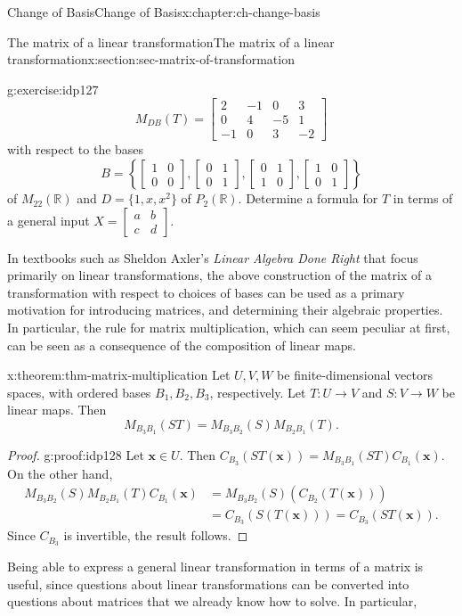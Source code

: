 \documentclass[oneside,10pt,]{book}
\numberwithin{equation}{section}
\newcommand{\bbm}{\begin{bmatrix}}
\newcommand{\ebm}{\end{bmatrix}}
\newcommand{\R}{\mathbb{R}}
\newcommand{\xx}{\mathbf{x}}
\newcommand{\amp}{&}
\begin{document}
\begin{chapterptx}{Change of Basis}{}{Change of Basis}{}{}{x:chapter:ch-change-basis}
\begin{sectionptx}{The matrix of a linear transformation}{}{The matrix of a linear transformation}{}{}{x:section:sec-matrix-of-transformation}
\begin{inlineexercise}{}{g:exercise:idp127}
\begin{equation*}
M_{DB}(T) = \bbm 2\amp -1\amp 0\amp 3\\0\amp 4\amp -5\amp 1\\-1\amp 0\amp 3\amp -2\ebm
\end{equation*}
with respect to the bases%
\begin{equation*}
B = \left\{\bbm 1\amp 0\\0\amp 0\ebm, \bbm 0\amp 1\\0\amp 1\ebm, \bbm 0\amp 1\\1\amp 0\ebm, \bbm 1\amp 0\\0\amp 1\ebm\right\}
\end{equation*}
of \(M_{22}(\R)\) and \(D=\{1,x,x^2\}\) of \(P_2(\R)\). Determine a formula for \(T\) in terms of a general input \(X=\bbm a\amp b\\c\amp d\ebm\).%
\end{inlineexercise}%
In textbooks such as Sheldon Axler's \emph{Linear Algebra Done Right} that focus primarily on linear transformations, the above construction of the matrix of a transformation with respect to choices of bases can be used as a primary motivation for introducing matrices, and determining their algebraic properties. In particular, the rule for matrix multiplication, which can seem peculiar at first, can be seen as a consequence of the composition of linear maps.%
\begin{theorem}{}{}{x:theorem:thm-matrix-multiplication}%
Let \(U,V,W\) be finite-dimensional vectors spaces, with ordered bases \(B_1,B_2,B_3\), respectively. Let \(T:U\to V\) and \(S:V\to W\) be linear maps. Then%
\begin{equation*}
M_{B_3B_1}(ST) = M_{B_3B_2}(S)M_{B_2B_1}(T)\text{.}
\end{equation*}
%
\end{theorem}
\begin{proof}{}{g:proof:idp128}
Let \(\xx\in U\). Then \(C_{B_3}(ST(\xx)) = M_{B_3B_1}(ST)C_{B_1}(\xx)\). On the other hand,%
\begin{align*}
M_{B_3B_2}(S)M_{B_2B_1}(T)C_{B_1}(\xx) \amp  = M_{B_3B_2}(S)(C_{B_2}(T(\xx)))\\
\amp = C_{B_3}(S(T(\xx))) = C_{B_3}(ST(\xx))\text{.}
\end{align*}
Since \(C_{B_3}\) is invertible, the result follows.%
\end{proof}
Being able to express a general linear transformation in terms of a matrix is useful, since questions about linear transformations can be converted into questions about matrices that we already know how to solve. In particular,%

\end{sectionptx}
\end{chapterptx}
\end{document}
